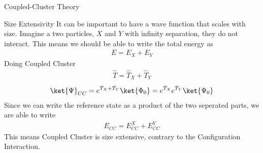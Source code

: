 \documentclass[twoside,english]{uiofysmaster}
\begin{document}
\begin{chapter}{Coupled-Cluster Theory}
  	\begin{section}{Size Extensivity}
  		It can be important to have a wave function that scales with size. Imagine a two particles, $X$ and $Y$ with infinity separation, they do not interact. This means we should be able to write the total energy as
  		\begin{align}
  			E = E_X + E_Y
  		\end{align}
  		Doing Coupled Cluster
  		\begin{align}
  			\hat T = \hat T_X + \hat T_Y 
  		\end{align}
  		\begin{align}
  			\ket{\Psi}_{CC} = e^{\hat T_X + \hat T_Y} \ket{\Phi_0} = e^{\hat T_X} e^{\hat T_Y} \ket{\Psi_0}
  		\end{align}
  		Since we can write the reference state as a product of the two seperated parts, we are able to write
  		\begin{align}
  			E_{CC} = E_{CC}^X + E_{CC}^Y
  		\end{align}
  		This means Coupled Cluster is size extensive, contrary to the Configuration Interaction. 
  	\end{section}

\end{chapter}
\end{document}
